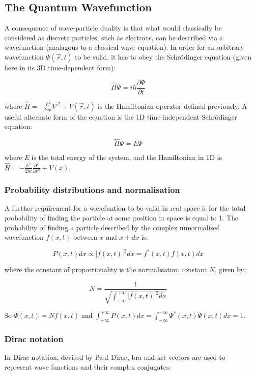 \subsection{The Quantum Wavefunction}

A consequence of wave-particle duality is that what would classically be considered as discrete particles, such as electrons, can be described via a wavefunction (analagous to a classical wave equation). In order for an arbitrary wavefunction $\Psi(\vec{r}, t)$ to be valid, it has to obey the Schr\"odinger equation (given here in its 3D time-dependent form):

\[ \hat{H}\Psi = i\hbar\frac{\partial\Psi}{\partial t} \]

where $\hat{H} = -\frac{\hbar^2}{2m}\nabla^2 + V(\vec{r}, t)$ is the Hamiltonian operator defined previously. A useful alternate form of the equation is the 1D time-independent Schr\"odinger equation:

\[ \hat{H}\Psi = E\Psi \]

where $E$ is the total energy of the system, and the Hamiltonian in 1D is $\hat{H} = -\frac{\hbar^2}{2m}\frac{\partial^2}{\partial x^2} + V(x)$.

\subsubsection{Probability distributions and normalisation}

A further requirement for a wavefuntion to be valid in real space is for the total probability of finding the particle at some position in space is equal to 1. The probability of finding a particle described by the complex unnormalised wavefunction $f(x,t)$ between $x$ and $x+dx$ is:

\[ P(x,t)dx \propto \left|f(x,t)\right|^2 dx = f^*(x,t)f(x,t) dx \]

where the constant of proportionality is the normalisation constant $N$, given by:

\[ N = \frac{1}{\sqrt{\int_{-\infty}^{+\infty} \left|f(x,t)\right|^2 dx}} \]

So $\Psi(x,t) = Nf(x,t)$ and $\int_{-\infty}^{+\infty} P(x,t)dx = \int_{-\infty}^{+\infty} \Psi^*(x,t)\Psi(x,t)dx = 1$.

\subsubsection{Dirac notation}

In Dirac notation, devised by Paul Dirac, bra and ket vectors are used to represent wave functions and their complex conjugates:

